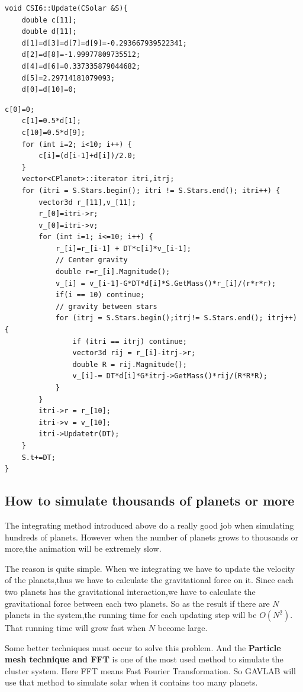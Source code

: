 \documentclass[12pt]{article}
\begin{document}
\begin{lstlisting}[caption=CSI6 Part I]
void CSI6::Update(CSolar &S){
    double c[11];
    double d[11];
    d[1]=d[3]=d[7]=d[9]=-0.293667939522341;
    d[2]=d[8]=-1.99977809735512;
    d[4]=d[6]=0.337335879044682;
    d[5]=2.29714181079093;
    d[0]=d[10]=0;
\end{lstlisting}
\begin{lstlisting}[caption=CSI6 Part II]
    c[0]=0;
    c[1]=0.5*d[1];
    c[10]=0.5*d[9];
    for (int i=2; i<10; i++) {
        c[i]=(d[i-1]+d[i])/2.0;
    }
    vector<CPlanet>::iterator itri,itrj;
    for (itri = S.Stars.begin(); itri != S.Stars.end(); itri++) {
        vector3d r_[11],v_[11];
        r_[0]=itri->r;
        v_[0]=itri->v;
        for (int i=1; i<=10; i++) {
            r_[i]=r_[i-1] + DT*c[i]*v_[i-1];
            // Center gravity
            double r=r_[i].Magnitude();
            v_[i] = v_[i-1]-G*DT*d[i]*S.GetMass()*r_[i]/(r*r*r);
            if(i == 10) continue;
            // gravity between stars
            for (itrj = S.Stars.begin();itrj!= S.Stars.end(); itrj++) {
                if (itri == itrj) continue;
                vector3d rij = r_[i]-itrj->r;
                double R = rij.Magnitude();
                v_[i]-= DT*d[i]*G*itrj->GetMass()*rij/(R*R*R);
            }
        }
        itri->r = r_[10];
        itri->v = v_[10];
        itri->Updatetr(DT);
    }
    S.t+=DT; 
}
\end{lstlisting}

\subsection{How to simulate thousands of planets or more}
The integrating method introduced above do a really good job when simulating hundreds of planets.
However when the number of planets grows to thousands or more,the animation will be extremely slow.

The reason is quite simple.
When we integrating we have to update the velocity of the planets,thus we have to calculate the gravitational
force on it.
Since each two planets has the gravitational interaction,we have to calculate the gravitational force between each two planets.
So as the result if there are $N$ planets in the system,the running time for each updating step will be $O\left( N^2\right)$.
That running time will grow fast when $N$ become large.

Some better techniques must occur to solve this problem.
And the \textbf{Particle mesh technique and FFT} is one of the most used method to simulate the cluster system.
Here FFT means Fast Fourier Transformation.
So GAVLAB will use that method to simulate solar when it contains too many planets.
\end{document}
